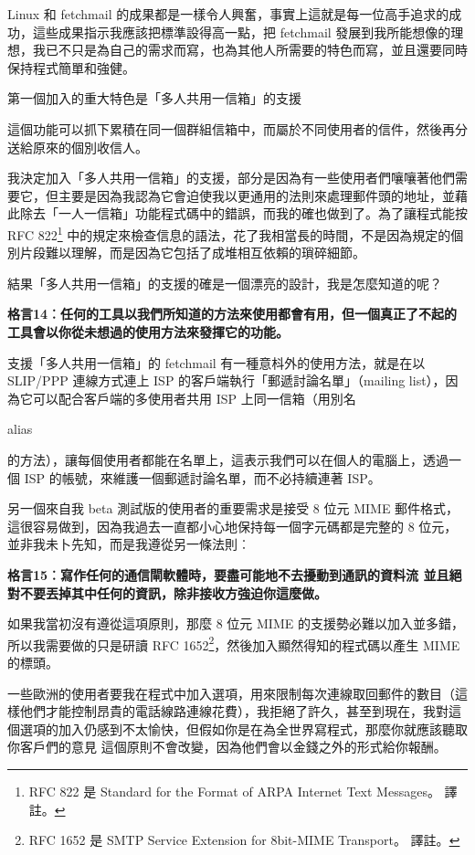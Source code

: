 \documentclass[12pt,]{article}
\makeatletter
\newcommand*{\shifttext}[2]{%
  \settowidth{\@tempdima}{#2}%
  \makebox[\@tempdima]{\hspace*{#1}#2}%
}
\makeatother
\begin{document}
Linux 和 fetchmail
的成果都是一樣令人興奮，事實上這就是每一位高手追求的成功，這些成果指示我應該把標準設得高一點，把
fetchmail
發展到我所能想像的理想，我已不只是為自己的需求而寫，也為其他人所需要的特色而寫，並且還要同時保持程式簡單和強健。

第一個加入的重大特色是「多人共用一信箱」的支援 \shifttext{1pt}{---}\shifttext{-1pt}{---}
這個功能可以抓下累積在同一個群組信箱中，而屬於不同使用者的信件，然後再分送給原來的個別收信人。

我決定加入「多人共用一信箱」的支援，部分是因為有一些使用者們嚷嚷著他們需要它，但主要是因為我認為它會迫使我以更通用的法則來處理郵件頭的地址，並藉此除去「一人一信箱」功能程式碼中的錯誤，而我的確也做到了。為了讓程式能按
RFC 822\footnote{RFC 822 是 Standard for the Format of ARPA Internet
  Text Messages。 \shifttext{1pt}{---}\shifttext{-1pt}{---} 譯註。}
中的規定來檢查信息的語法，花了我相當長的時間，不是因為規定的個別片段難以理解，而是因為它包括了成堆相互依賴的瑣碎細節。

結果「多人共用一信箱」的支援的確是一個漂亮的設計，我是怎麼知道的呢？

\textbf{格言14︰任何的工具以我們所知道的方法來使用都會有用，但一個真正了不起的工具會以你從未想過的使用方法來發揮它的功能。}

支援「多人共用一信箱」的 fetchmail 有一種意枓外的使用方法，就是在以
SLIP/PPP 連線方式連上 ISP 的客戶端執行「郵遞討論名單」（mailing
list），因為它可以配合客戶端的多使用者共用 ISP 上同一信箱（用別名 \shifttext{1pt}{---}\shifttext{-1pt}{---}
alias \shifttext{1pt}{---}\shifttext{-1pt}{---}
的方法），讓每個使用者都能在名單上，這表示我們可以在個人的電腦上，透過一個
ISP 的帳號，來維護一個郵遞討論名單，而不必持續連著 ISP。

另一個來自我 beta 測試版的使用者的重要需求是接受 8 位元 MIME
郵件格式，這很容易做到，因為我過去一直都小心地保持每一個字元碼都是完整的 8
位元，並非我未卜先知，而是我遵從另一條法則︰

\textbf{格言15︰寫作任何的通信閘軟體時，要盡可能地不去擾動到通訊的資料流
\shifttext{1pt}{---}\shifttext{-1pt}{---} 並且絕對不要丟掉其中任何的資訊，除非接收方強迫你這麼做。}

如果我當初沒有遵從這項原則，那麼 8 位元 MIME
的支援勢必難以加入並多錯，所以我需要做的只是研讀 RFC 1652\footnote{RFC
  1652 是 SMTP Service Extension for 8bit-MIME Transport。 \shifttext{1pt}{---}\shifttext{-1pt}{---} 譯註。}，然後加入顯然得知的程式碼以產生
MIME 的標頭。

一些歐洲的使用者要我在程式中加入選項，用來限制每次連線取回郵件的數目（這樣他們才能控制昂貴的電話線路連線花費），我拒絕了許久，甚至到現在，我對這個選項的加入仍感到不太愉快，但假如你是在為全世界寫程式，那麼你就應該聽取你客戶們的意見
\shifttext{1pt}{---}\shifttext{-1pt}{---} 這個原則不會改變，因為他們會以金錢之外的形式給你報酬。
\end{document}
